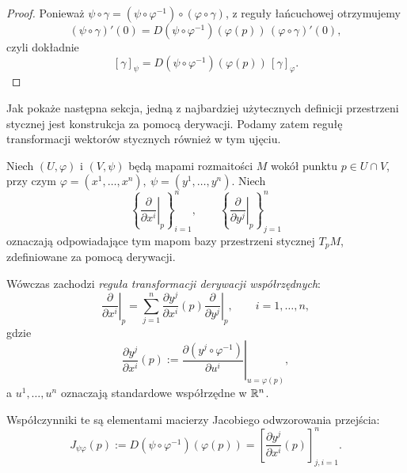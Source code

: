 \begin{proof}
Ponieważ $\psi\circ\gamma = (\psi\circ\varphi^{-1})\circ(\varphi\circ\gamma)$,
z reguły łańcuchowej otrzymujemy
\[
(\psi\circ\gamma)'(0)
=
D(\psi\circ\varphi^{-1})(\varphi(p))
\,(\varphi\circ\gamma)'(0),
\]
czyli dokładnie
\[
[\gamma]_{\psi}
=
D(\psi\circ\varphi^{-1})(\varphi(p))\,[\gamma]_{\varphi}.
\]
\end{proof}
Jak pokaże następna sekcja, jedną z najbardziej użytecznych definicji
przestrzeni stycznej jest konstrukcja za pomocą derywacji.
Podamy zatem regułę transformacji wektorów stycznych również
w tym ujęciu.

\begin{fakt}
\label{fakt:transformacja-derywacji}
Niech $(U,\varphi)$ i $(V,\psi)$ będą mapami rozmaitości
$M$ wokół punktu $p\in U\cap V$, przy czym $\varphi=(x^1,\ldots,x^n), \ \psi=(y^1,\ldots,y^n)$.
Niech
\[
\left\{
\left.\frac{\partial}{\partial x^i}\right|_p
\right\}_{i=1}^n,
\qquad
\left\{
\left.\frac{\partial}{\partial y^j}\right|_p
\right\}_{j=1}^n
\]
oznaczają odpowiadające tym mapom bazy przestrzeni
stycznej $T_pM$, zdefiniowane za pomocą derywacji.

Wówczas zachodzi \emph{reguła transformacji derywacji
współrzędnych}:
\begin{equation}
\label{eq:transformacja-derywacji}
\boxed{
\left.\frac{\partial}{\partial x^i}\right|_p
=
\sum_{j=1}^n
\frac{\partial y^j}{\partial x^i}(p)
\left.\frac{\partial}{\partial y^j}\right|_p,
\qquad i=1,\ldots,n,
}
\end{equation}
gdzie
\[
\frac{\partial y^j}{\partial x^i}(p)
:=
\left.
\frac{\partial(y^j\circ\varphi^{-1})}{\partial u^i}
\right|_{u=\varphi(p)},
\]
a $u^1,\ldots,u^n$ oznaczają standardowe współrzędne
w $\mathbb{R}^n$.

Współczynniki te są elementami macierzy Jacobiego
odwzorowania przejścia:
\[
\boxed{
J_{\psi\varphi}(p)
:=
D(\psi\circ\varphi^{-1})(\varphi(p))
=
\left[
\frac{\partial y^j}{\partial x^i}(p)
\right]_{j,i=1}^n.
}
\]
\end{fakt}

